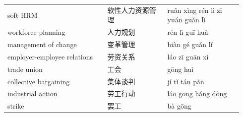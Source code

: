 \documentclass[11pt]{article}
\begin{document}
\begin{longtable}{@{}p{0.40\linewidth}p{0.24\linewidth}p{0.30\linewidth}@{}}
soft HRM & 软性人力资源管理 & ruǎn xìng rén lì zī yuán guǎn lǐ \\
workforce planning & 人力规划 & rén lì guī huà \\
management of change & 变革管理 & biàn gé guǎn lǐ \\
employer-employee relations & 劳资关系 & láo zī guān xì \\
trade union & 工会 & gōng huì \\
collective bargaining & 集体谈判 & jí tǐ tán pàn \\
industrial action & 劳工行动 & láo gōng háng dòng \\
strike & 罢工 & bà gōng \\
\end{longtable}
\end{document}
